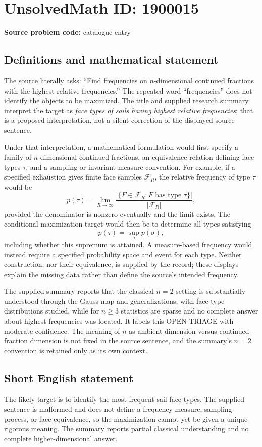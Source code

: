 \documentclass[11pt]{article}
\begin{document}
\section*{UnsolvedMath ID: 1900015}
\textbf{Source problem code:} catalogue entry
\subsection{Definitions and mathematical statement}
The source literally asks: ``Find frequencies on $n$-dimensional continued fractions with the highest relative frequencies.'' The repeated word ``frequencies'' does not identify the objects to be maximized. The title and supplied research summary interpret the target as \emph{face types of sails having highest relative frequencies}; that is a proposed interpretation, not a silent correction of the displayed source sentence.

Under that interpretation, a mathematical formulation would first specify a family of $n$-dimensional continued fractions, an equivalence relation defining face types $\tau$, and a sampling or invariant-measure convention. For example, if a specified exhaustion gives finite face samples $\mathcal F_R$, the relative frequency of type $\tau$ would be
\[
p(\tau)=\lim_{R\to\infty}
\frac{|\{F\in\mathcal F_R:F\text{ has type }\tau\}|}{|\mathcal F_R|},
\]
provided the denominator is nonzero eventually and the limit exists. The conditional maximization target would then be to determine all types satisfying
\[
p(\tau)=\sup_{\sigma}p(\sigma),
\]
including whether this supremum is attained. A measure-based frequency would instead require a specified probability space and event for each type. Neither construction, nor their equivalence, is supplied by the record; these displays explain the missing data rather than define the source's intended frequency.

The supplied summary reports that the classical $n=2$ setting is substantially understood through the Gauss map and generalizations, with face-type distributions studied, while for $n\geq3$ statistics are sparse and no complete answer about highest frequencies was located. It labels this OPEN-TRIAGE with moderate confidence. The meaning of $n$ as ambient dimension versus continued-fraction dimension is not fixed in the source sentence, and the summary's $n=2$ convention is retained only as its own context.
\subsection{Short English statement}
The likely target is to identify the most frequent sail face types. The supplied sentence is malformed and does not define a frequency measure, sampling process, or face equivalence, so the maximization cannot yet be given a unique rigorous meaning. The summary reports partial classical understanding and no complete higher-dimensional answer.
\end{document}
